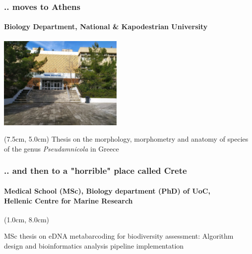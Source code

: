 \documentclass{beamer}
\begin{document}
   \begin{frame}
      \frametitle{.. moves to Athens}
      \framesubtitle{Biology Department, National \& Kapodestrian University}
      \includegraphics[width=60mm]{resources/biol_depart_ekpa.jpg} 
      \begin{textblock*}{5cm}(7.5cm, 5.0cm)
         \small Thesis on the morphology, morphometry and anatomy of species of the genus \textit{Pseudamnicola} in Greece
      \end{textblock*}
   \end{frame}

   \begin{frame}

      \frametitle{.. and then to a "horrible" place called Crete}
      \framesubtitle{
         Medical School (MSc), Biology department (PhD) of UoC, \\
         Hellenic Centre for Marine Research
         }


      \begin{textblock*}{10cm}(1.0cm, 8.0cm)

         \small MSc thesis on eDNA metabarcoding for biodiversity assessment: 
         Algorithm design and bioinformatics analysis pipeline implementation
         
      \end{textblock*}

   \end{frame}
\end{document}
